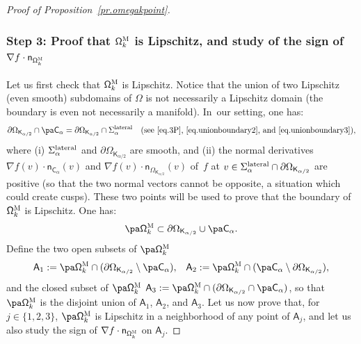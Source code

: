\begin{proof}[Proof of Proposition~\ref{pr.omegakpoint}]
\subsubsection*{Step 3: Proof that $\mathsf \Omega_k^{\textsc{M}}$ is
Lipschitz, and study of the sign of $\nabla f\cdot \mathsf n _{\mathsf \Omega_k^{\textsc{M}}}$}
Let us first check that $\mathsf \Omega_k^{\textsc{M}}$ is
Lipschitz. Notice that the union of two Lipschitz (even smooth)
subdomains of $\Omega$ is not necessarily a Lipschitz domain (the
boundary is even not necessarily a manifold). In~our setting, one has:
\[
\partial \Omega_{\mathsf K_{\alpha/2}}\cap \pa \mathsf
C_\alpha=\partial \Omega_{\mathsf K_{\alpha/2}} \cap
\Sigma_\alpha^{\textup{lateral}} \quad\text{(see~\eqref{eq.3P},~\eqref{eq.unionboundary2},
and~\eqref{eq.unionboundary3})},
\]
where (i) $\Sigma_\alpha^{\textup{lateral}}$ and $\partial \Omega_{\mathsf K_{\alpha/2}}$ are smooth, and (ii) the normal derivatives $\nabla f(v)\cdot \mathsf n_{\mathsf C_\alpha}(v)$ and $\nabla f(v)\cdot \mathsf n_{ \Omega_{\mathsf K_{\alpha/2}}}(v)$ of~$f$ at $v\in \Sigma_\alpha^{\textup{lateral}}\cap \partial \Omega_{\mathsf K_{\alpha/2}}$ are positive (so that the two normal vectors cannot be opposite, a situation which could create cusps). These two points will be used to prove that the boundary of $\mathsf \Omega_k^{\textsc{M}}$ is Lipschitz.
One has:
\begin{equation}\label{eq.=pa-domk-union}
\pa \mathsf \Omega_k^{\textsc{M}} \subset \partial \Omega_{\mathsf K_{\alpha/2}} \cup \pa \mathsf C_\alpha.
\end{equation}
Define the two open subsets of $\pa \mathsf \Omega_k^{\textsc{M}}$
\begin{equation}\label{eq.A1A2}
\mathsf A_1:=\pa \mathsf \Omega_k^{\textsc{M}} \cap (\partial \Omega_{\mathsf K_{\alpha/2}}\setminus \pa \mathsf C_\alpha), \ \ \, \mathsf A_2:= \pa \mathsf \Omega_k^{\textsc{M}}\cap (\pa \mathsf C_\alpha\setminus\partial \Omega_{\mathsf K_{\alpha/2}}),
\end{equation}
and the closed subset of $\pa \mathsf \Omega_k^{\textsc{M}}$
$\mathsf A_3:= \pa \mathsf \Omega_k^{\textsc{M}} \cap (\partial \Omega_{\mathsf K_{\alpha/2}}\cap \pa \mathsf C_\alpha)$,
so that $\pa \mathsf \Omega_k^{\textsc{M}}$ is the disjoint union of
$\mathsf A_1$, $\mathsf A_2$, and $\mathsf A_3$. Let us now prove
that, for $j\in \{1,2,3\}$, $\pa \mathsf \Omega_k^{\textsc{M}}$ is
Lipschitz in a neighborhood of any point of $\mathsf A_j$, and let us
also study the sign of $\nabla f\cdot \mathsf n_{ \mathsf
\Omega_k^{\textsc{M}}}$ on $\mathsf A_j$.


\end{proof}

